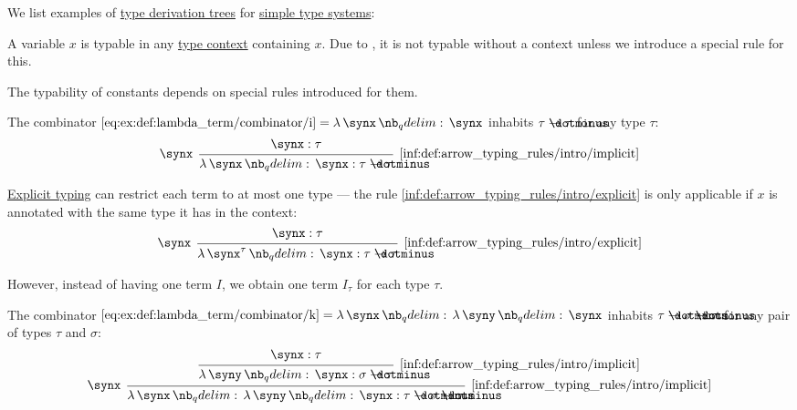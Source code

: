 \begin{example}\label{ex:def:type_derivation_tree}
  We list examples of \hyperref[def:type_derivation_tree]{type derivation trees} for \hyperref[def:simple_type_system]{simple type systems}:
  \begin{thmenum}
     A variable \( x \) is typable in any \hyperref[def:type_context]{type context} containing \( x \). Due to , it is not typable without a context unless we introduce a special rule for this.

     The typability of constants depends on special rules introduced for them.

     The combinator \( \ref{eq:ex:def:lambda_term/combinator/i} = \qabs \synx \synx \) inhabits \( \tau \synimplies \tau \) for any type \( \tau \):
    \begin{equation*}
      \begin{prooftree}
        \hypo{ \synx: \tau }
        \infer[left label=\( \synx \)]1[\ref{inf:def:arrow_typing_rules/intro/implicit}]{ \qabs \synx \synx: \tau \synimplies \tau }
      \end{prooftree}
    \end{equation*}

    \hyperref[def:simple_type_system_style]{Explicit typing} can restrict each term to at most one type --- the rule \ref{inf:def:arrow_typing_rules/intro/explicit} is only applicable if \( x \) is annotated with the same type it has in the context:
    \begin{equation*}
      \begin{prooftree}
        \hypo{ \synx: \tau }
        \infer[left label=\( \synx \)]1[\ref{inf:def:arrow_typing_rules/intro/explicit}]{ \qabs {\synx^\tau} \synx: \tau \synimplies \tau }
      \end{prooftree}
    \end{equation*}

    However, instead of having one term \( I \), we obtain one term \( I_\tau \) for each type \( \tau \).

     The combinator \( \ref{eq:ex:def:lambda_term/combinator/k} = \qabs \synx \qabs \syny \synx \) inhabits \( \tau \synimplies \sigma \synimplies \tau \) for any pair of types \( \tau \) and \( \sigma \):
    \begin{equation*}
      \begin{prooftree}
        \hypo{ \synx: \tau }
        \infer1[\ref{inf:def:arrow_typing_rules/intro/implicit}]{ \qabs \syny \synx: \sigma \synimplies \tau }
        \infer[left label=\( \synx \)]1[\ref{inf:def:arrow_typing_rules/intro/implicit}]{ \qabs \synx \qabs \syny \synx: \tau \synimplies \sigma \synimplies \tau }
      \end{prooftree}
    \end{equation*}


\end{thmenum}
\end{example}
